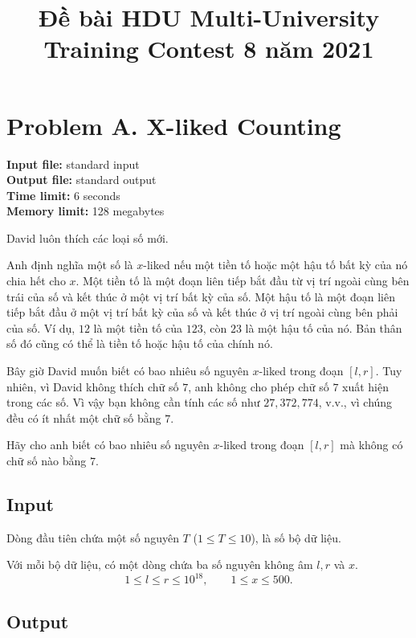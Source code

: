 \documentclass[11pt]{article}
\title{Đề bài HDU Multi-University Training Contest 8 năm 2021}
\author{}
\date{}
\begin{document}
\maketitle


\section{Problem A. X-liked Counting}

\noindent
\textbf{Input file:} standard input\\
\textbf{Output file:} standard output\\
\textbf{Time limit:} 6 seconds\\
\textbf{Memory limit:} 128 megabytes

David luôn thích các loại số mới.

Anh định nghĩa một số là $x$-liked nếu một tiền tố hoặc một hậu tố bất kỳ của
nó chia hết cho $x$. Một tiền tố là một đoạn liên tiếp bắt đầu từ vị trí ngoài
cùng bên trái của số và kết thúc ở một vị trí bất kỳ của số. Một hậu tố là một
đoạn liên tiếp bắt đầu ở một vị trí bất kỳ của số và kết thúc ở vị trí ngoài
cùng bên phải của số. Ví dụ, $12$ là một tiền tố của $123$, còn $23$ là một
hậu tố của nó. Bản thân số đó cũng có thể là tiền tố hoặc hậu tố của chính nó.

Bây giờ David muốn biết có bao nhiêu số nguyên $x$-liked trong đoạn $[l,r]$.
Tuy nhiên, vì David không thích chữ số $7$, anh không cho phép chữ số $7$ xuất
hiện trong các số. Vì vậy bạn không cần tính các số như $27,372,774$, v.v.,
vì chúng đều có ít nhất một chữ số bằng $7$.

Hãy cho anh biết có bao nhiêu số nguyên $x$-liked trong đoạn $[l,r]$ mà không
có chữ số nào bằng $7$.

\subsection*{Input}

Dòng đầu tiên chứa một số nguyên $T$ ($1\le T\le 10$), là số bộ dữ liệu.

Với mỗi bộ dữ liệu, có một dòng chứa ba số nguyên không âm $l,r$ và $x$.
\[
  1\le l\le r\le 10^{18},\qquad 1\le x\le 500.
\]

\subsection*{Output}
\end{document}
